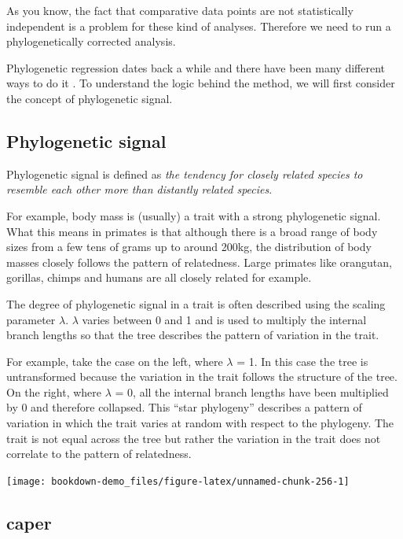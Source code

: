 \documentclass[
]{book}
\begin{document}
As you know, the fact that comparative data points are not statistically independent is a problem for these kind of analyses. Therefore we need to run a phylogenetically corrected analysis.

Phylogenetic regression dates back a while and there have been many different ways to do it \citep{Grafen89, Nunn11}. To understand the logic behind the method, we will first consider the concept of phylogenetic signal.

\hypertarget{phylogenetic-signal-1}{%
\subsection{Phylogenetic signal}\label{phylogenetic-signal-1}}

Phylogenetic signal is defined as \emph{the tendency for closely related species to resemble each other more than distantly related species}.

For example, body mass is (usually) a trait with a strong phylogenetic signal. What this means in primates is that although there is a broad range of body sizes from a few tens of grams up to around 200kg, the distribution of body masses closely follows the pattern of relatedness. Large primates like orangutan, gorillas, chimps and humans are all closely related for example.

The degree of phylogenetic signal in a trait is often described using the scaling parameter \(\lambda\). \(\lambda\) varies between 0 and 1 and is used to multiply the internal branch lengths so that the tree describes the pattern of variation in the trait.

For example, take the case on the left, where \(\lambda\) = 1. In this case the tree is untransformed because the variation in the trait follows the structure of the tree. On the right, where \(\lambda\) = 0, all the internal branch lengths have been multiplied by 0 and therefore collapsed. This ``star phylogeny'' describes a pattern of variation in which the trait varies at random with respect to the phylogeny. The trait is not equal across the tree but rather the variation in the trait does not correlate to the pattern of relatedness.

\begin{center}\texttt{[image: bookdown-demo\_files/figure-latex/unnamed-chunk-256-1]} \end{center}

\hypertarget{caper}{%
\subsection{caper}\label{caper}}
\end{document}
